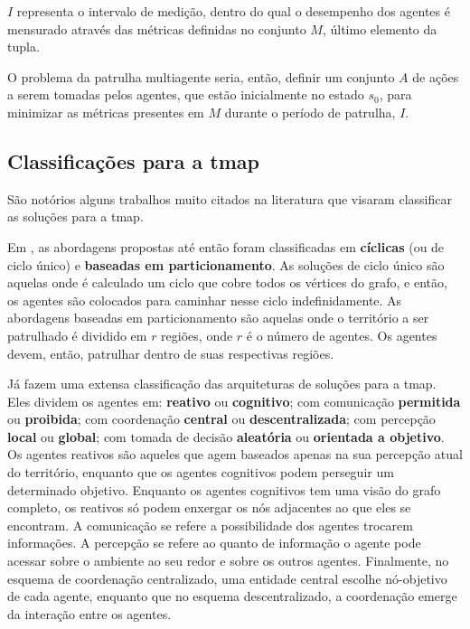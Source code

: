 $I$ representa o intervalo de medição, dentro do qual o desempenho dos agentes 
é mensurado através das métricas definidas no conjunto $M$, último elemento da 
tupla.

O problema da patrulha multiagente seria, então, definir um conjunto $A$ de 
ações a serem tomadas pelos agentes, que estão inicialmente no estado $s_{0}$, 
para minimizar as métricas presentes em $M$ durante o período de patrulha, $I$.

\subsection{Classificações para a \ac{tmap}}

São notórios alguns trabalhos muito citados na literatura que visaram 
classificar as soluções para a \ac{tmap}.

Em \citep{Chevaleyre:2004:TAM:1018411.1019013}, as abordagens propostas até 
então foram classificadas em \textbf{cíclicas} (ou de ciclo único) e \textbf{
baseadas em particionamento}. As soluções de ciclo único são aquelas onde é 
calculado um ciclo que cobre todos os vértices do grafo, e então, os agentes são 
colocados para caminhar nesse ciclo indefinidamente. As abordagens baseadas em 
particionamento são aquelas onde o território a ser patrulhado é dividido em 
$r$ regiões, onde $r$ é o número de agentes. Os agentes devem, então, patrulhar 
dentro de suas respectivas regiões.

Já \citep{Machado:2002:MPE:1765317.1765332} fazem uma extensa classificação das 
arquiteturas de soluções para a \ac{tmap}. Eles dividem os agentes em: \textbf{
reativo} ou \textbf{cognitivo}; com comunicação \textbf{permitida} ou \textbf{
proibida}; com coordenação \textbf{central} ou \textbf{descentralizada}; com 
percepção \textbf{local} ou \textbf{global}; com tomada de decisão \textbf{
aleatória} ou \textbf{orientada a objetivo}. Os agentes reativos são aqueles que 
agem baseados apenas na sua percepção atual do território, enquanto que os 
agentes cognitivos podem perseguir um determinado objetivo. Enquanto os agentes 
cognitivos tem uma visão do grafo completo, os reativos só podem enxergar os nós 
adjacentes ao que eles se encontram. A comunicação se refere a possibilidade dos 
agentes trocarem informações. A percepção se refere ao quanto de informação o 
agente pode acessar sobre o ambiente ao seu redor e sobre os outros agentes. 
Finalmente, no esquema de coordenação centralizado, uma entidade central escolhe 
nó-objetivo de cada agente, enquanto que no esquema descentralizado, a 
coordenação emerge da interação entre os agentes.

